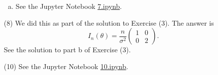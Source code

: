 \documentclass[10pt]{article}
\begin{document}
\begin{enumerate}
\begin{enumerate}[(a)]
\item See the Jupyter Notebook
\href{https://github.com/ajrasmus/some_of_statistics/blob/main/chapter_9/7.ipynb}{7.ipynb}.

\end{enumerate}

\item[(8)]
We did this as part of the solution to Exercise (3). The answer is
\[
I_n(\theta) = \frac{n}{\sigma^2} \begin{pmatrix} 1 & 0 \\ 0 & 2 \end{pmatrix}.
\]
See the solution to part b of Exercise (3).

\item[(10)]
See the Jupyter Notebook
\href{https://github.com/ajrasmus/some_of_statistics/blob/main/chapter_9/10.ipynb}{10.ipynb}.
\end{enumerate}
\end{document}
